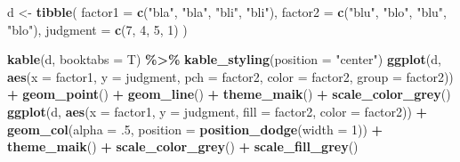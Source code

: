 \documentclass[
    numbers=noenddot,
    open=any,
    paper=a4,
    oneside,
    pagesize,
    captions=tableheading,
    bibliography=totoc,
    11pt
    ]{scrbook}
\newenvironment{Shaded}{\begin{snugshade}}{\end{snugshade}}
\newcommand{\DataTypeTok}[1]{\textcolor[rgb]{0.13,0.29,0.53}{#1}}
\newcommand{\DecValTok}[1]{\textcolor[rgb]{0.00,0.00,0.81}{#1}}
\newcommand{\FloatTok}[1]{\textcolor[rgb]{0.00,0.00,0.81}{#1}}
\newcommand{\KeywordTok}[1]{\textcolor[rgb]{0.13,0.29,0.53}{\textbf{#1}}}
\newcommand{\NormalTok}[1]{#1}
\newcommand{\OperatorTok}[1]{\textcolor[rgb]{0.81,0.36,0.00}{\textbf{#1}}}
\newcommand{\StringTok}[1]{\textcolor[rgb]{0.31,0.60,0.02}{#1}}
\begin{document}
\begin{Shaded}
\begin{Highlighting}[]
\NormalTok{d \textless{}{-}}\StringTok{ }\KeywordTok{tibble}\NormalTok{(}
  \DataTypeTok{factor1 =} \KeywordTok{c}\NormalTok{(}\StringTok{"bla"}\NormalTok{, }\StringTok{"bla"}\NormalTok{, }\StringTok{"bli"}\NormalTok{, }\StringTok{"bli"}\NormalTok{),}
  \DataTypeTok{factor2 =} \KeywordTok{c}\NormalTok{(}\StringTok{"blu"}\NormalTok{, }\StringTok{"blo"}\NormalTok{, }\StringTok{"blu"}\NormalTok{, }\StringTok{"blo"}\NormalTok{),}
  \DataTypeTok{judgment =} \KeywordTok{c}\NormalTok{(}\DecValTok{7}\NormalTok{, }\DecValTok{4}\NormalTok{, }\DecValTok{5}\NormalTok{, }\DecValTok{1}\NormalTok{)}
\NormalTok{)}

\KeywordTok{kable}\NormalTok{(d, }\DataTypeTok{booktabs =}\NormalTok{ T) }\OperatorTok{\%\textgreater{}\%}
\StringTok{  }\KeywordTok{kable\_styling}\NormalTok{(}\DataTypeTok{position =} \StringTok{"center"}\NormalTok{)}
\KeywordTok{ggplot}\NormalTok{(d, }\KeywordTok{aes}\NormalTok{(}\DataTypeTok{x =}\NormalTok{ factor1, }\DataTypeTok{y =}\NormalTok{ judgment, }\DataTypeTok{pch =}\NormalTok{ factor2, }\DataTypeTok{color =}\NormalTok{ factor2, }\DataTypeTok{group =}\NormalTok{ factor2)) }\OperatorTok{+}
\StringTok{  }\KeywordTok{geom\_point}\NormalTok{() }\OperatorTok{+}
\StringTok{  }\KeywordTok{geom\_line}\NormalTok{() }\OperatorTok{+}
\StringTok{  }\KeywordTok{theme\_maik}\NormalTok{() }\OperatorTok{+}
\StringTok{  }\KeywordTok{scale\_color\_grey}\NormalTok{()}
\KeywordTok{ggplot}\NormalTok{(d, }\KeywordTok{aes}\NormalTok{(}\DataTypeTok{x =}\NormalTok{ factor1, }\DataTypeTok{y =}\NormalTok{ judgment, }\DataTypeTok{fill =}\NormalTok{ factor2, }\DataTypeTok{color =}\NormalTok{ factor2)) }\OperatorTok{+}
\StringTok{  }\KeywordTok{geom\_col}\NormalTok{(}\DataTypeTok{alpha =} \FloatTok{.5}\NormalTok{, }\DataTypeTok{position =} \KeywordTok{position\_dodge}\NormalTok{(}\DataTypeTok{width =} \DecValTok{1}\NormalTok{)) }\OperatorTok{+}
\StringTok{  }\KeywordTok{theme\_maik}\NormalTok{() }\OperatorTok{+}
\StringTok{  }\KeywordTok{scale\_color\_grey}\NormalTok{() }\OperatorTok{+}
\StringTok{  }\KeywordTok{scale\_fill\_grey}\NormalTok{()}
\end{Highlighting}
\end{Shaded}


    \printbibliography[heading=bibintoc]
\end{document}
